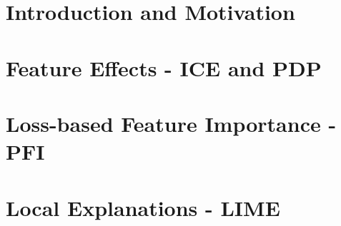 \documentclass[11pt,compress,t,notes=noshow, aspectratio=169, xcolor=table]{beamer}
\begin{document}



\section{Introduction and Motivation}

% 
% 

%

\section{Feature Effects - ICE and PDP}

%

%
%

\section{Loss-based Feature Importance - PFI}

%

\section{Local Explanations - LIME}


%
%

%
\end{document}
